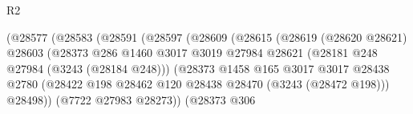 \begin{lexlean}{R2}
\begin{coremodule}
                                              (@28577
                                                (@28583
                                                  (@28591
                                                    (@28597
                                                      (@28609
                                                        (@28615
                                                          (@28619
                                                            (@28620 @28621)
                                                            @28603
                                                            (@28373
                                                              @286
                                                              @1460
                                                              @3017
                                                              @3019
                                                              @27984
                                                              @28621
                                                              (@28181
                                                                @248
                                                                @27984
                                                                (@3243 (@28184 @248)))
                                                              (@28373
                                                                @1458
                                                                @165
                                                                @3017
                                                                @3017
                                                                @28438
                                                                @2780
                                                                (@28422
                                                                  @198
                                                                  @28462
                                                                  @120
                                                                  @28438
                                                                  @28470
                                                                  (@3243 (@28472 @198)))
                                                                @28498))
                                                            (@7722 @27983 @28273))
                                                          (@28373
                                                            @306

\end{coremodule}
\end{lexlean}
